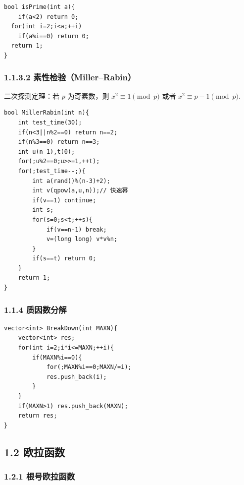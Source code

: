 \documentclass[UTF8,a4paper,11pt]{ctexart}
\begin{document}
\begin{Verbatim}[fontsize=\small,frame=single,breaklines=true,breakanywhere=true]
bool isPrime(int a){
    if(a<2) return 0;
  for(int i=2;i<a;++i)
    if(a%i==0) return 0;
  return 1;
}
\end{Verbatim}
\subsubsection*{1.1.3.2 素性检验（Miller–Rabin）}

二次探测定理：若 $p$ 为奇素数，则 $x^2\equiv1 \pmod{p}$ 或者 $x^2\equiv p-1 \pmod{p}$.

\begin{Verbatim}[fontsize=\small,frame=single,breaklines=true,breakanywhere=true]
bool MillerRabin(int n){
    int test_time(30);
    if(n<3||n%2==0) return n==2;
    if(n%3==0) return n==3;
    int u(n-1),t(0);
    for(;u%2==0;u>>=1,++t);
    for(;test_time--;){
        int a(rand()%(n-3)+2);
        int v(qpow(a,u,n));// 快速幂
        if(v==1) continue;
        int s;
        for(s=0;s<t;++s){
            if(v==n-1) break;
            v=(long long) v*v%n;
        }
        if(s==t) return 0;
    }
    return 1;
}
\end{Verbatim}
\subsubsection*{1.1.4 质因数分解}

\begin{Verbatim}[fontsize=\small,frame=single,breaklines=true,breakanywhere=true]
vector<int> BreakDown(int MAXN){
    vector<int> res;
    for(int i=2;i*i<=MAXN;++i){
        if(MAXN%i==0){
            for(;MAXN%i==0;MAXN/=i);
            res.push_back(i);
        }
    }
    if(MAXN>1) res.push_back(MAXN);
    return res;
}
\end{Verbatim}
\subsection*{1.2 欧拉函数}

\subsubsection*{1.2.1 根号欧拉函数}
\end{document}
